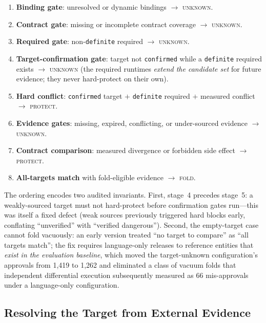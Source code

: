 \documentclass[sigconf,nonacm]{acmart}
\begin{document}
\begin{enumerate}
  \item \textbf{Binding gate}: unresolved or dynamic bindings $\to$ \textsc{unknown}.
  \item \textbf{Contract gate}: missing or incomplete contract coverage $\to$ \textsc{unknown}.
  \item \textbf{Required gate}: non-\texttt{definite} required $\to$ \textsc{unknown}.
  \item \textbf{Target-confirmation gate}: target not \texttt{confirmed} while a \texttt{definite} required exists $\to$ \textsc{unknown} (the required runtimes \emph{extend the candidate set} for future evidence; they never hard-protect on their own).
  \item \textbf{Hard conflict}: \texttt{confirmed} target $+$ \texttt{definite} required $+$ measured conflict $\to$ \textsc{protect}.
  \item \textbf{Evidence gates}: missing, expired, conflicting, or under-sourced evidence $\to$ \textsc{unknown}.
  \item \textbf{Contract comparison}: measured divergence or forbidden side effect $\to$ \textsc{protect}.
  \item \textbf{All-targets match} with fold-eligible evidence $\to$ \textsc{fold}.
\end{enumerate}

The ordering encodes two audited invariants. First, stage~4 precedes stage~5: a weakly-sourced target must not hard-protect before confirmation gates run---this was itself a fixed defect (weak sources previously triggered hard blocks early, conflating ``unverified'' with ``verified dangerous''). Second, the empty-target case cannot fold vacuously: an early version treated ``no target to compare'' as ``all targets match''; the fix requires language-only releases to reference entities that \emph{exist in the evaluation baseline}, which moved the target-unknown configuration's approvals from 1{,}419 to 1{,}262 and eliminated a class of vacuum folds that independent differential execution subsequently measured as 66 mis-approvals under a language-only configuration.

\subsection{Resolving the Target from External Evidence}\label{sec:resolver}
\end{document}

